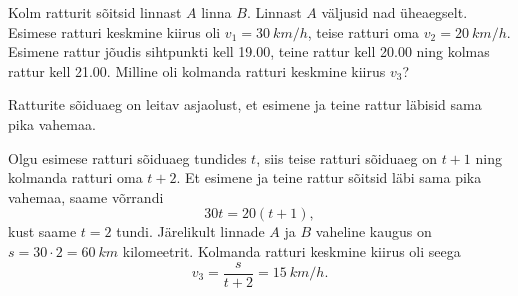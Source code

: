 
Kolm ratturit sõitsid linnast $A$ linna $B$. Linnast $A$ väljusid nad üheaegselt. Esimese ratturi keskmine kiirus oli $v_1 = \SI{30}{km/h}$, teise ratturi oma $v_2 = \SI{20}{km/h}$. Esimene rattur jõudis sihtpunkti kell 19.00, teine rattur kell 20.00 ning kolmas rattur kell 21.00. Milline oli kolmanda ratturi keskmine kiirus $v_3$?

\hint
Ratturite sõiduaeg on leitav asjaolust, et esimene ja teine rattur läbisid sama pika vahemaa.

\solu
Olgu esimese ratturi sõiduaeg tundides $t$, siis teise ratturi sõiduaeg on $t + 1$ ning kolmanda ratturi oma $t+2$. Et esimene ja teine rattur sõitsid läbi sama pika vahemaa, saame võrrandi
\[
30 t=20(t+1),
\]
kust saame $t = \num{2}$ tundi. Järelikult linnade $A$ ja $B$ vaheline kaugus on $s = \num{30}·\num{2} = \SI{60}{km}$ kilomeetrit. Kolmanda ratturi keskmine kiirus oli seega
\[
v_{3}=\frac{s}{t+2}=\SI{15}{km/h}.
\]
\probend